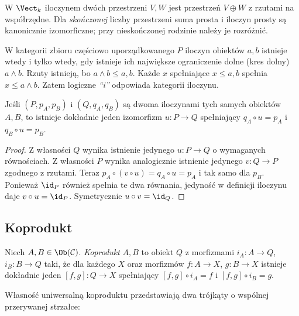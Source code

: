 \begin{przyklad}
W $\Vect_k$ iloczynem dwóch przestrzeni $V,W$ jest przestrzeń $V\oplus W$ z rzutami na współrzędne. Dla \emph{skończonej} liczby przestrzeni suma prosta i iloczyn prosty są kanonicznie izomorficzne; przy nieskończonej rodzinie należy je rozróżnić.
\end{przyklad}

\begin{przyklad}
W kategorii zbioru częściowo uporządkowanego $P$ iloczyn obiektów $a,b$ istnieje wtedy i tylko wtedy, gdy istnieje ich największe ograniczenie dolne (kres dolny) $a\wedge b$. Rzuty istnieją, bo $a\wedge b\leq a,b$. Każde $x$ spełniające $x\leq a,b$ spełnia $x\leq a\wedge b$. Zatem logiczne \emph{``i''} odpowiada kategorii iloczynu.
\end{przyklad}

\begin{twierdzenie}\label{tw:produkt-unique}
Jeśli $(P,p_A,p_B)$ i $(Q,q_A,q_B)$ są dwoma iloczynami tych samych obiektów $A,B$, to istnieje dokładnie jeden izomorfizm $u:P\to Q$ spełniający $q_A\circ u=p_A$ i $q_B\circ u=p_B$.
\end{twierdzenie}
\begin{proof}
Z własności $Q$ wynika istnienie jedynego $u:P\to Q$ o wymaganych równościach. Z własności $P$ wynika analogicznie istnienie jedynego $v:Q\to P$ zgodnego z rzutami. Teraz $p_A\circ(v\circ u)=q_A\circ u=p_A$ i tak samo dla $p_B$. Ponieważ $\id_P$ również spełnia te dwa równania, jedyność w definicji iloczynu daje $v\circ u=\id_P$. Symetrycznie $u\circ v=\id_Q$.
\end{proof}

\subsection{Koprodukt}

\begin{definicja}\label{def:koprodukt}
Niech $A,B\in\Ob(\mathcal C)$. \emph{Koprodukt} $A,B$ to obiekt $Q$ z morfizmami $i_A:A\to Q$, $i_B:B\to Q$ taki, że dla każdego $X$ oraz morfizmów $f:A\to X$, $g:B\to X$ istnieje dokładnie jeden $[f,g]:Q\to X$ spełniający $[f,g]\circ i_A=f$ i $[f,g]\circ i_B=g$.
\end{definicja}
Własność uniwersalną koproduktu przedstawiają dwa trójkąty o wspólnej przerywanej strzałce:
\begin{center}
\end{center}

